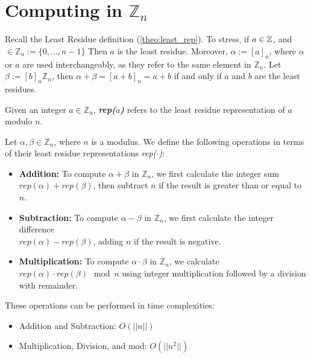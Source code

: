 \newpage 
\section{Computing in \(\mathbb{Z}_n\)}
Recall the Least Residue definition (\ref{theo:least_rep}). 
To stress, if $a\in\mathbb{Z}$, and $\in\mathbb{Z}_n:=\{0,\dots,n-1\}$ Then $a$ is the least residue.
Moreover, $\alpha:=[a]_n$, where $\alpha$ or $a$ are used interchangeably, as they refer to the same element in $\mathbb{Z}_n$.
Let $\beta:=[b]_n\mathbb{Z}_n$, then $\alpha+\beta=[a+b]_n=a+b$ if and only if $a$ and $b$ are the least residues. 

\begin{Func}

    Given an integer $a \in \mathbb{Z}_n$, \textbf{\textit{rep($a$)}} refers to the least residue representation of $a$ modulo $n$.
\end{Func}

\begin{theo}

    \label{theo:zn_operations}
    Let $\alpha, \beta \in \mathbb{Z}_n$, where $n$ is a modulus. We define the following operations in terms of their least residue representations \textit{rep($\cdot$)}:
    \begin{itemize}
        \item \textbf{Addition:} To compute \(\alpha + \beta\) in \(\mathbb{Z}_n\), we first calculate the integer sum \(\textit{rep}(\alpha) + \textit{rep}(\beta)\), then subtract $n$ if the result is greater than or equal to $n$.
        \item \textbf{Subtraction:} To compute \(\alpha - \beta\) in \(\mathbb{Z}_n\), we first calculate the integer difference\\
         \(\textit{rep}(\alpha) - \textit{rep}(\beta)\), adding $n$ if the result is negative.
        \item \textbf{Multiplication:} To compute \(\alpha \cdot \beta\) in \(\mathbb{Z}_n\), we calculate \(\textit{rep}(\alpha) \cdot \textit{rep}(\beta) \mod n\) using integer multiplication followed by a division with remainder.
    \end{itemize}
    These operations can be performed in time complexities:
    \begin{itemize}
        \item Addition and Subtraction: \(O(||n||)\)
        \item Multiplication, Division, and mod: \(O(||n^2||)\)
    \end{itemize}
\end{theo}

